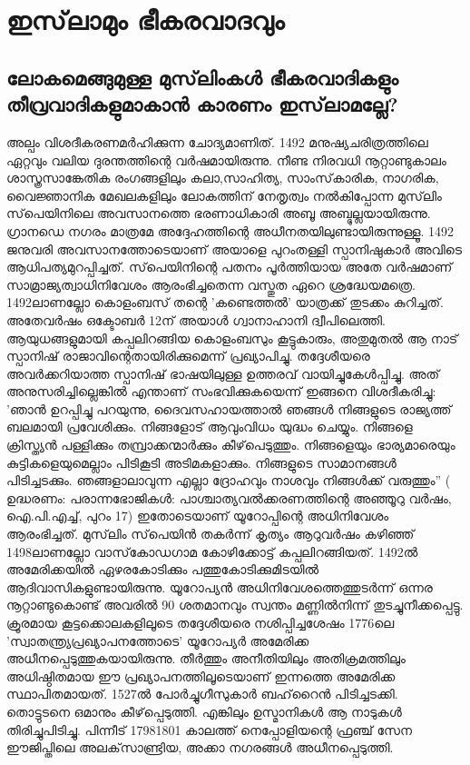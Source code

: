 \chapter{ഇസ്‌ലാമും ഭീകരവാദവും}
\section{  ലോകമെങ്ങുമുള്ള മുസ്‌ലിംകള്‍ ഭീകരവാദികളും തീവ്രവാദികളുമാകാന്‍ കാരണം ഇസ്‌ലാമല്ലേ?}
    
 അല്പം വിശദീകരണമര്‍ഹിക്കുന്ന ചോദ്യമാണിത്. 1492 മനുഷ്യചരിത്രത്തിലെ ഏറ്റവും വലിയ ദുരന്തത്തിന്റെ വര്‍ഷമായിരുന്നു. നീണ്ട നിരവധി നൂറ്റാണ്ടുകാലം ശാസ്ത്രസാങ്കേതിക രംഗങ്ങളിലും കലാ,സാഹിത്യ, സാംസ്‌കാരിക, നാഗരിക, വൈജ്ഞാനിക മേഖലകളിലും ലോകത്തിന് നേതൃത്വം നല്‍കിപ്പോന്ന മുസ്‌ലിം സ്‌പെയിനിലെ അവസാനത്തെ ഭരണാധികാരി അബൂ അബ്ദുല്ലയായിരുന്നു. ഗ്രാനഡെ നഗരം മാത്രമേ അദ്ദേഹത്തിന്റെ അധീനതയിലുണ്ടായിരുന്നുള്ളൂ. 1492 ജനുവരി അവസാനത്തോടെയാണ് അയാളെ പുറംതള്ളി സ്പാനിഷുകാര്‍ അവിടെ ആധിപത്യമുറപ്പിച്ചത്. സ്‌പെയിനിന്റെ പതനം പൂര്‍ത്തിയായ അതേ വര്‍ഷമാണ് സാമ്രാജ്യത്വാധിനിവേശം ആരംഭിച്ചതെന്ന വസ്തുത ഏറെ ശ്രദ്ധേയമത്രെ. 1492ലാണല്ലോ കൊളംബസ് തന്റെ 'കണ്ടെത്തല്‍' യാത്രക്ക് തുടക്കം കുറിച്ചത്.
അതേവര്‍ഷം ഒക്ടോബര്‍ 12ന് അയാള്‍ ഗ്വാനാഹാനി ദ്വീപിലെത്തി. ആയുധങ്ങളുമായി കപ്പലിറങ്ങിയ കൊളംബസും കൂട്ടുകാരും, അതുമുതല്‍ ആ നാട് സ്പാനിഷ് രാജാവിന്റെതായിരിക്കുമെന്ന് പ്രഖ്യാപിച്ചു. തദ്ദേശീയരെ അവര്‍ക്കറിയാത്ത സ്പാനിഷ് ഭാഷയിലുള്ള ഉത്തരവ് വായിച്ചുകേള്‍പ്പിച്ചു. അത് അനുസരിച്ചില്ലെങ്കില്‍ എന്താണ് സംഭവിക്കുകയെന്ന് ഇങ്ങനെ വിശദീകരിച്ചു: 'ഞാന്‍ ഉറപ്പിച്ചു പറയുന്നു, ദൈവസഹായത്താല്‍ ഞങ്ങള്‍ നിങ്ങളുടെ രാജ്യത്ത് ബലമായി പ്രവേശിക്കും. നിങ്ങളോട് ആവുംവിധം യുദ്ധം ചെയ്യും. നിങ്ങളെ ക്രിസ്ത്യന്‍ പള്ളിക്കും തമ്പ്രാക്കന്മാര്‍ക്കും കീഴ്‌പെടുത്തും. നിങ്ങളെയും ഭാര്യമാരെയും കുട്ടികളെയുമെല്ലാം പിടികൂടി അടിമകളാക്കും. നിങ്ങളുടെ സാമാനങ്ങള്‍ പിടിച്ചടക്കും. ഞങ്ങളാലാവുന്ന എല്ലാ ദ്രോഹവും നാശവും നിങ്ങള്‍ക്ക് വരുത്തും'' ( ഉദ്ധരണം: പരാന്നഭോജികള്‍: പാശ്ചാത്യവല്‍ക്കരണത്തിന്റെ അഞ്ഞൂറു വര്‍ഷം, ഐ.പി.എച്ച്, പുറം 17)
ഇതോടെയാണ് യൂറോപ്പിന്റെ അധിനിവേശം ആരംഭിച്ചത്. മുസ്‌ലിം സ്‌പെയിന്‍ തകര്‍ന്ന് കൃത്യം ആറുവര്‍ഷം കഴിഞ്ഞ് 1498ലാണല്ലോ വാസ്‌കോഡഗാമ കോഴിക്കോട്ട് കപ്പലിറങ്ങിയത്.
1492ല്‍ അമേരിക്കയില്‍ ഏഴരകോടിക്കും പത്തുകോടിക്കുമിടയില്‍ ആദിവാസികളുണ്ടായിരുന്നു. യൂറോപ്യന്‍ അധിനിവേശത്തെത്തുടര്‍ന്ന് ഒന്നര നൂറ്റാണ്ടുകൊണ്ട് അവരില്‍ 90 ശതമാനവും സ്വന്തം മണ്ണില്‍നിന്ന് തുടച്ചുനീക്കപ്പെട്ടു. ക്രൂരമായ കൂട്ടക്കൊലകളിലൂടെ തദ്ദേശീയരെ നശിപ്പിച്ചശേഷം 1776ലെ 'സ്വാതന്ത്യ്രപ്രഖ്യാപനത്തോടെ' യൂറോപ്യര്‍ അമേരിക്ക അധീനപ്പെടുത്തുകയായിരുന്നു. തീര്‍ത്തും അനീതിയിലും അതിക്രമത്തിലും അധിഷ്ഠിതമായ ഈ പ്രഖ്യാപനത്തിലൂടെയാണ് ഇന്നത്തെ അമേരിക്ക സ്ഥാപിതമായത്.
1527ല്‍ പോര്‍ച്ചുഗീസുകാര്‍ ബഹ്‌റൈന്‍ പിടിച്ചടക്കി. തൊട്ടുടനെ ഒമാനും കീഴ്‌പ്പെടുത്തി. എങ്കിലും ഉസ്മാനികള്‍ ആ നാടുകള്‍ തിരിച്ചുപിടിച്ചു. പിന്നീട് 17981801 കാലത്ത് നെപ്പോളിയന്റെ ഫ്രഞ്ച് സേന ഈജിപ്തിലെ അലക്‌സാണ്ട്രിയ, അക്കാ നഗരങ്ങള്‍ അധീനപ്പെടുത്തി.
